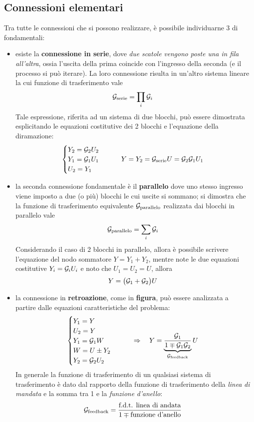 	\subsection{Connessioni elementari}
		Tra tutte le connessioni che si possono realizzare, è possibile individuarne 3 di fondamentali:
		\begin{itemize}
			\item esiste la \textbf{connessione in serie}, dove \textit{due scatole vengono poste una in fila all'altra}, ossia l'uscita della prima coincide con l'ingresso della seconda (e il processo si può iterare). La loro connessione risulta in un'altro sistema lineare la cui funzione di trasferimento vale
			\[ \mathcal G_\textrm{serie} = \prod_i \mathcal G_i  \]
			Tale espressione, riferita ad un sistema di due blocchi, può essere dimostrata esplicitando le equazioni costitutive dei 2 blocchi e l'equazione della diramazione:
			\[ \begin{cases}
				Y_2 = \mathcal G_2 U_2 \\ Y_1 = \mathcal G_1 U_1 \\ U_2 = Y_1 
			\end{cases} \qquad Y = Y_2 = \mathcal G_\textrm{serie} U = \mathcal G_2\mathcal G_1 U_1\]
			
			\item la seconda connessione fondamentale è il \textbf{parallelo} dove uno stesso ingresso viene imposto a due (o più) blocchi le cui uscite si sommano; si dimostra che la funzione di trasferimento equivalente $\mathcal G_\textrm{parallelo}$ realizzata dai blocchi in parallelo vale
			\[ \mathcal G_\textrm{parallelo} = \sum_i \mathcal G_i \]
			Considerando il caso di 2 blocchi in parallelo, allora è possibile scrivere l'equazione del nodo sommatore $Y = Y_1 + Y_2$, mentre note le due equazioni costitutive $Y_i = \mathcal G_i U_i$ e noto che $U_1 = U_2 = U$, allora
			\[ Y = \big(\mathcal G_1 + \mathcal G_2\big)U \]
			
			\item la connessione in \textbf{retroazione}, come in \textbf{figura}, può essere analizzata a partire dalle equazioni caratteristiche del problema:
			\[ \begin{cases}
				Y_1 = Y \\ U_2 = Y \\ Y_1 = \mathcal G_1 W \\ W = U \pm Y_2 \\ Y_2 = \mathcal G_2 U_2
			\end{cases} \qquad \Rightarrow \quad Y = \underbrace{\frac{\mathcal G_1}{1 \mp \mathcal G_1\mathcal G_2}}_{\mathcal G_\textrm{feedback}} U \]
			In generale la funzione di trasferimento di un qualsiasi sistema di trasferimento è dato dal rapporto della funzione di trasferimento della \textit{linea di mandata} e la somma tra 1 e la \textit{funzione d'anello}:
			\[ \mathcal G_\textrm{feedback} = \frac{\textrm{f.d.t. linea di andata}}{1 \mp \textrm{funzione d'anello}}\]
			
		\end{itemize}
	
